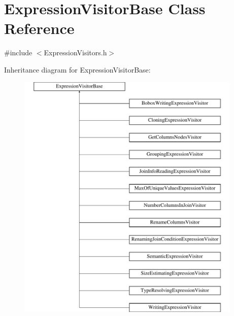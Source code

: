 \hypertarget{class_expression_visitor_base}{\section{Expression\+Visitor\+Base Class Reference}
\label{class_expression_visitor_base}
}


{\ttfamily \#include $<$Expression\+Visitors.\+h$>$}

Inheritance diagram for Expression\+Visitor\+Base\+:\begin{figure}[H]
\begin{center}
\leavevmode
\includegraphics[height=12.000000cm]{class_expression_visitor_base}
\end{center}
\end{figure}
